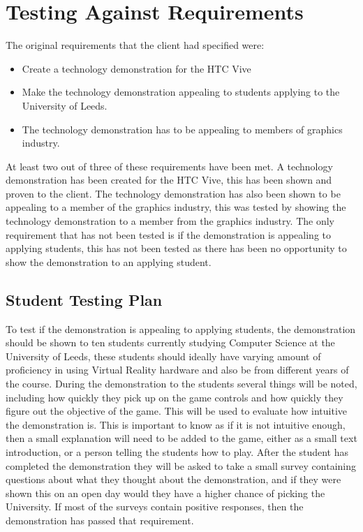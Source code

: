 \section{Testing Against Requirements}
	The original requirements that the client had specified were:

\begin{itemize}
	\item Create a technology demonstration for the HTC Vive
	\item Make the technology demonstration appealing to students applying to the University of Leeds.
	\item The technology demonstration has to be appealing to members of graphics industry.
\end{itemize}

	At least two out of three of these requirements have been met. A technology demonstration has been created for the HTC Vive, this has been shown and proven to the client. The technology demonstration has also been shown to be appealing to a member of the graphics industry, this was tested by showing the technology demonstration to a member from the graphics industry. The only requirement that has not been tested is if the demonstration is appealing to applying students, this has not been tested as there has been no opportunity to show the demonstration to an applying student.

	\subsection{Student Testing Plan}
		To test if the demonstration is appealing to applying students, the demonstration should be shown to ten students currently studying Computer Science at the University of Leeds, these students should ideally have varying amount of proficiency in using Virtual Reality hardware and also be from different years of the course. During the demonstration to the students several things will be noted, including how quickly they pick up on the game controls and how quickly they figure out the objective of the game. This will be used to evaluate how intuitive the demonstration is. This is important to know as if it is not intuitive enough, then a small explanation will need to be added to the game, either as a small text introduction, or a person telling the students how to play. After the student has completed the demonstration they will be asked to take a small survey containing questions about what they thought about the demonstration, and if they were shown this on an open day would they have a higher chance of picking the University. If most of the surveys contain positive responses, then the demonstration has passed that requirement.

